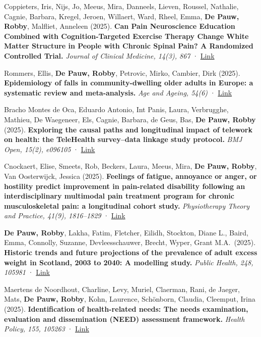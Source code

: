 \documentclass[
  letterpaper,
  DIV=11,
  numbers=noendperiod]{scrartcl}
\begin{document}
Coppieters, Iris, Nijs, Jo, Meeus, Mira, Danneels, Lieven, Roussel,
Nathalie, Cagnie, Barbara, Kregel, Jeroen, Willaert, Ward, Rheel, Emma,
\textbf{De Pauw, Robby}, Malfliet, Anneleen (2025). \textbf{Can Pain
Neuroscience Education Combined with Cognition-Targeted Exercise Therapy
Change White Matter Structure in People with Chronic Spinal Pain? A
Randomized Controlled Trial.} \emph{Journal of Clinical Medicine, 14(3),
867} · \href{http://dx.doi.org/10.3390/JCM14030867}{Link}

Rommers, Ellis, \textbf{De Pauw, Robby}, Petrovic, Mirko, Cambier, Dirk
(2025). \textbf{Epidemiology of falls in community-dwelling older adults
in Europe: a systematic review and meta-analysis.} \emph{Age and Ageing,
54(6)} · \href{http://dx.doi.org/10.1093/AGEING/AFAF157}{Link}

Bracho Montes de Oca, Eduardo Antonio, Int Panis, Laura, Verbrugghe,
Mathieu, De Waegeneer, Els, Cagnie, Barbara, de Geus, Bas, \textbf{De
Pauw, Robby} (2025). \textbf{Exploring the causal paths and longitudinal
impact of telework on health: the TeleHealth survey--data linkage study
protocol.} \emph{BMJ Open, 15(2), e096105} ·
\href{http://dx.doi.org/10.1136/BMJOPEN-2024-096105}{Link}

Cnockaert, Elise, Smeets, Rob, Beckers, Laura, Meeus, Mira, \textbf{De
Pauw, Robby}, Van Oosterwijck, Jessica (2025). \textbf{Feelings of
fatigue, annoyance or anger, or hostility predict improvement in
pain-related disability following an interdisciplinary multimodal pain
treatment program for chronic musculoskeletal pain: a longitudinal
cohort study.} \emph{Physiotherapy Theory and Practice, 41(9),
1816--1829} ·
\href{http://dx.doi.org/10.1080/09593985.2025.2482056}{Link}

\textbf{De Pauw, Robby}, Lakha, Fatim, Fletcher, Eilidh, Stockton, Diane
L., Baird, Emma, Connolly, Suzanne, Devleesschauwer, Brecht, Wyper,
Grant M.A.~(2025). \textbf{Historic trends and future projections of the
prevalence of adult excess weight in Scotland, 2003 to 2040: A modelling
study.} \emph{Public Health, 248, 105981} ·
\href{http://dx.doi.org/10.1016/J.PUHE.2025.105981}{Link}

Maertens de Noordhout, Charline, Levy, Muriel, Claerman, Rani, de
Jaeger, Mats, \textbf{De Pauw, Robby}, Kohn, Laurence, Schönborn,
Claudia, Cleemput, Irina (2025). \textbf{Identification of
health-related needs: The needs examination, evaluation and
dissemination (NEED) assessment framework.} \emph{Health Policy, 155,
105263} · \href{http://dx.doi.org/10.1016/J.HEALTHPOL.2025.105263}{Link}
\end{document}
